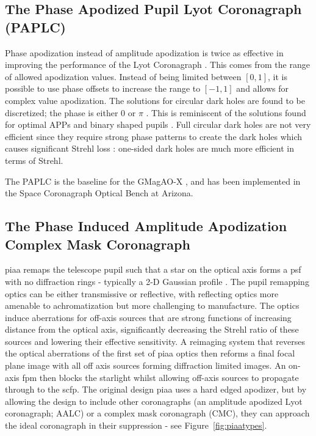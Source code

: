 \documentclass[letterpaper]{ar-1col}
\begin{document}
\subsection{The Phase Apodized Pupil Lyot Coronagraph (PAPLC)}
\label{sec:paplc}
Phase apodization instead of amplitude apodization is twice as effective in improving the performance of the Lyot Coronagraph \citep{Por20}.
%
This comes from the range of allowed apodization values.
%
Instead of being limited between $[0, 1]$, it is possible to use phase offsets to increase the range to $[-1, 1]$ and allows for complex value apodization.
%
The solutions for circular dark holes are found to be discretized; the phase is either 0 or $\pi$ \citep{Por20}.
%
This is reminiscent of the solutions found for optimal APPs \citep{Por17} and binary shaped pupils \citep{Carlotti11}.
%
Full circular dark holes are not very efficient since they require strong phase patterns to create the dark holes which causes significant Strehl loss \citep{Por17}: one-sided dark holes are much more efficient in terms of Strehl. 

The PAPLC is the baseline for the GMagAO-X \citep{Males24}, and has been implemented in the Space Coronagraph Optical Bench \citep[SCOoB; ][]{Ashcraft22,vanGorkom22} at Arizona.

\subsection{The Phase Induced Amplitude Apodization Complex Mask Coronagraph}

\ac{piaa} remaps the telescope pupil such that a star on the optical axis forms a \ac{psf} with no diffraction rings - typically a 2-D Gaussian profile \citep{Guyon03,Guyon05,Guyon14}.
%
The pupil remapping optics can be either transmissive or reflective, with reflecting optics more amenable to achromatization but more challenging to manufacture.
%
The optics induce aberrations for off-axis sources that are strong functions of increasing distance from the optical axis, significantly decreasing the Strehl ratio of these sources and lowering their effective sensitivity.
%
A reimaging system that reverses the optical aberrations of the first set of \ac{piaa} optics then reforms a final focal plane image with all off axis sources forming diffraction limited images.
%
An on-axis \ac{fpm} then blocks the starlight whilst allowing off-axis sources to propagate through to the \ac{scfp}.
%
The original design \ac{piaa} uses a hard edged apodizer, but by allowing the design to include other coronagraphs (an amplitude apodized Lyot coronagraph; AALC) or a complex mask coronagraph (CMC), they can approach the ideal coronagraph in their suppression - see Figure~\ref{fig:piaatypes}.
\end{document}
